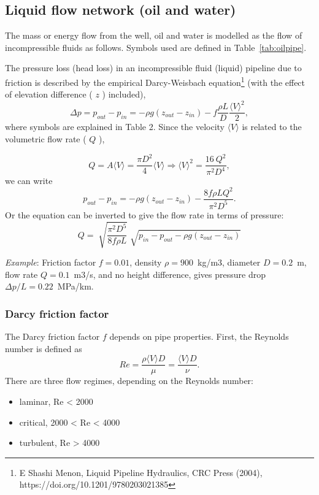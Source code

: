 \documentclass[12pt]{article}
\begin{document}
\subsection{Liquid flow network (oil and water)}

The mass or energy flow from the well, oil and water is modelled as the flow of incompressible fluids as follows.
Symbols used are defined in Table~\ref{tab:oilpipe}.

The pressure loss (head loss) in an incompressible fluid (liquid) pipeline due to friction is described by the empirical Darcy-Weisbach equation\footnote{ E Shashi Menon, Liquid Pipeline Hydraulics, CRC Press (2004), https://doi.org/10.1201/9780203021385  } (with the effect of elevation difference ( \( z \) ) included),
 \begin{equation}
 \Delta p=p_{out}-p_{in}
 	=- \rho g \left( z_{out}-z_{in} \right) -f\frac{ \rho L}{D}\frac{ \langle V \rangle ^{2}}{2}, 
 \end{equation}
where symbols are explained in Table 2. Since the velocity  \(  \langle V \rangle  \)  is related to the volumetric flow rate ( \( Q \) ),


 \begin{equation}
 Q=A \langle V \rangle 
 	=\frac{ \pi D^{2}}{4} \langle V \rangle  \Longrightarrow   \langle V \rangle ^{2}
 	=\frac{16~Q^{2}}{ \pi ^{2}D^{4}}, 
 \end{equation}
we can write
\begin{equation}
	p_{out}-p_{in}=- \rho g \left( z_{out}-z_{in} \right) -\frac{8f \rho LQ^{2}}{ \pi ^{2}D^{5}}. 
\end{equation}
Or the equation can be inverted to give the flow rate in terms of pressure:
\begin{equation}
 Q=\sqrt[]{\frac{ \pi ^{2}D^{5}}{8f \rho L}}\sqrt[]{p_{in}-p_{out}- \rho g \left( z_{out}-z_{in} \right) } 
\end{equation}
 
\textit{Example}: Friction factor  $f=0.01$, density  $\rho=900$~kg/m3, diameter  $D=0.2$~m, 
flow rate  $Q=0.1$~m3/s, and no height difference, gives pressure drop  $\Delta p/L=0.22$~MPa/km.


\subsubsection{Darcy friction factor}
The Darcy friction factor  \( f \)  depends on pipe properties. First, the Reynolds number is defined as 
\begin{equation}
	 Re=\frac{ \rho  \langle V \rangle D}{ \mu }=\frac{ \langle V \rangle D}{ \nu }.
\end{equation} 
%
There are three flow regimes, depending on the Reynolds number:
\begin{itemize}
	\item laminar, Re < 2000
	\item critical, 2000 < Re < 4000
	\item turbulent, Re > 4000
\end{itemize}
\end{document}
